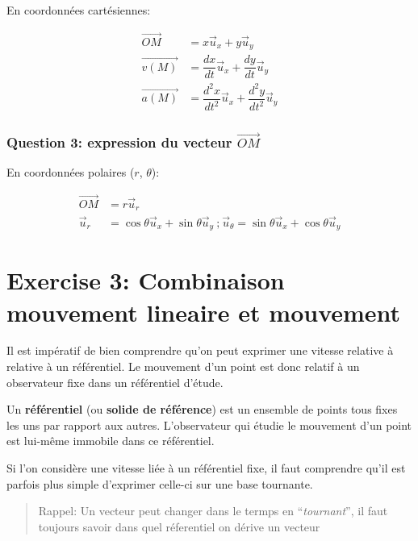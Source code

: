 \documentclass[
  12pt,
]{article}
\begin{document}
En coordonnées cartésiennes:

\begin{align*}
    \vec{OM} &= x \vec u_x + y \vec u_y\\
    \vec{v(M)} &= \dfrac{dx}{dt} \vec u_x + \dfrac{dy}{dt} \vec u_y\\
    \vec{a(M)} &= \dfrac{d^2x}{dt^2} \vec u_x + \dfrac{d^2y}{dt^2} \vec u_y
\end{align*}

\hypertarget{question-3-expression-du-vecteur-vecom}{%
\subsubsection{\texorpdfstring{Question 3: expression du vecteur
\(\vec{OM}\)}{Question 3: expression du vecteur \textbackslash vec\{OM\}}}\label{question-3-expression-du-vecteur-vecom}}

En coordonnées polaires (\(r\), \(\theta\)):

\begin{align*}
    \vec{OM} &= r \vec u_r \\
    \vec u_r &= \cos{\theta} \vec u_x + \sin{\theta} \vec u_y \ \text{;} \  \vec u_\theta = \sin{\theta} \vec u_x + \cos{\theta} \vec u_y
\end{align*}

\hypertarget{exercise-3-combinaison-mouvement-lineaire-et-mouvement}{%
\section{Exercise 3: Combinaison mouvement lineaire et
mouvement}\label{exercise-3-combinaison-mouvement-lineaire-et-mouvement}}

Il est impératif de bien comprendre qu'on peut exprimer une vitesse
relative à relative à un référentiel. Le mouvement d'un point est donc
relatif à un observateur fixe dans un référentiel d'étude.

\begin{tcolorbox}[enhanced jigsaw, toptitle=1mm, title=\textcolor{quarto-callout-tip-color}{\faLightbulb}\hspace{0.5em}{Tip}, left=2mm, colback=white, breakable, colframe=quarto-callout-tip-color-frame, leftrule=.75mm, bottomrule=.15mm, toprule=.15mm, coltitle=black, bottomtitle=1mm, opacityback=0, titlerule=0mm, arc=.35mm, rightrule=.15mm, opacitybacktitle=0.6, colbacktitle=quarto-callout-tip-color!10!white]

Un \textbf{référentiel} (ou \textbf{solide de référence}) est un
ensemble de points tous fixes les uns par rapport aux autres.
L'observateur qui étudie le mouvement d'un point est lui-même immobile
dans ce référentiel.

\end{tcolorbox}

Si l'on considère une vitesse liée à un référentiel fixe, il faut
comprendre qu'il est parfois plus simple d'exprimer celle-ci sur une
base tournante.

\begin{quote}
Rappel: Un vecteur peut changer dans le termps en ``\emph{tournant}'',
il faut toujours savoir dans quel réferentiel on dérive un vecteur
\end{quote}
\end{document}
